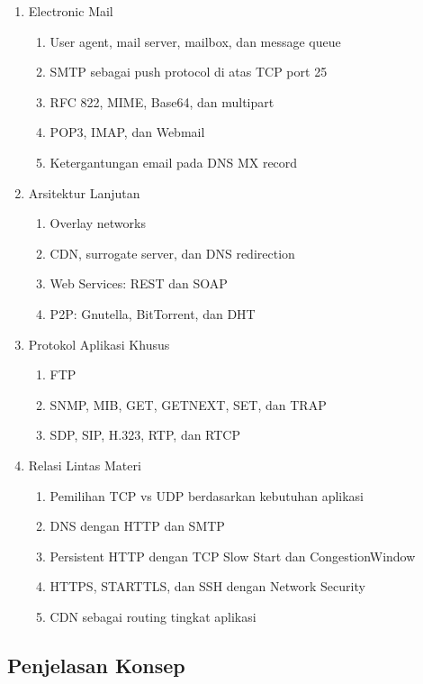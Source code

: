 \begin{enumerate}
    \item \pwajib Electronic Mail
    \begin{enumerate}
        \item \pwajib User agent, mail server, mailbox, dan message queue
        \item \pwajib SMTP sebagai push protocol di atas TCP port 25
        \item \pwajib RFC 822, MIME, Base64, dan multipart
        \item \pwajib POP3, IMAP, dan Webmail
        \item \pwajib Ketergantungan email pada DNS MX record
    \end{enumerate}
    \item \ppaham Arsitektur Lanjutan
    \begin{enumerate}
        \item \ppaham Overlay networks
        \item \pwajib CDN, surrogate server, dan DNS redirection
        \item \ppaham Web Services: REST dan SOAP
        \item \pwajib P2P: Gnutella, BitTorrent, dan DHT
    \end{enumerate}
    \item \ppaham Protokol Aplikasi Khusus
    \begin{enumerate}
        \item \ppaham FTP
        \item \ppaham SNMP, MIB, GET, GETNEXT, SET, dan TRAP
        \item \ppaham SDP, SIP, H.323, RTP, dan RTCP
    \end{enumerate}
    \item \pwajib Relasi Lintas Materi
    \begin{enumerate}
        \item \pwajib Pemilihan TCP vs UDP berdasarkan kebutuhan aplikasi
        \item \pwajib DNS dengan HTTP dan SMTP
        \item \pwajib Persistent HTTP dengan TCP Slow Start dan CongestionWindow
        \item \pwajib HTTPS, STARTTLS, dan SSH dengan Network Security
        \item \ppaham CDN sebagai routing tingkat aplikasi
    \end{enumerate}
\end{enumerate}

\subsection{Penjelasan Konsep}

